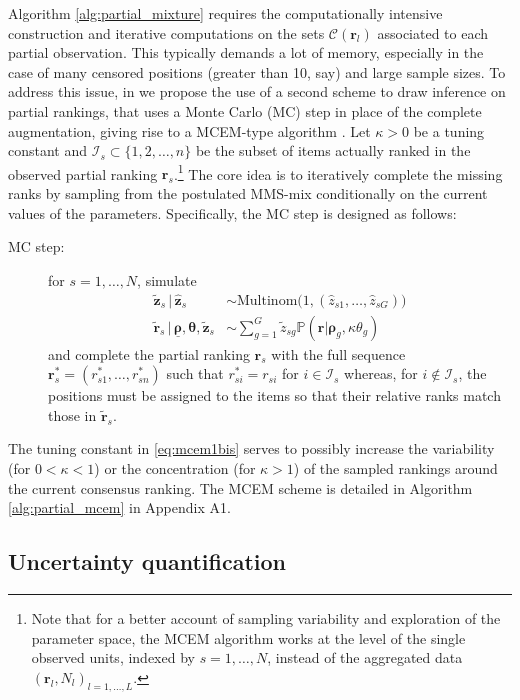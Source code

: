 Algorithm \ref{alg:partial_mixture} requires the computationally intensive construction and iterative computations on the sets $\mathcal{C}(\bm r_l)$ associated to each partial observation. This typically demands a lot of memory, especially in the case of many censored positions (greater than 10, say) and large sample sizes.
To address this issue, in  we propose the use of a second scheme to draw inference on partial rankings, that uses a Monte Carlo (MC) step in place of the complete augmentation, giving rise to a MCEM-type algorithm \citep{wei_tanner}. Let $\kappa > 0$ be a tuning constant and $\mathcal{I}_{s}\subset \{1,2,\dots,n\}$ be the subset of items actually ranked in the observed partial ranking $\bm{r}_s$.\footnote{Note that for a better account of sampling variability and exploration of the parameter space, the MCEM algorithm works at the level of the single observed units, indexed by $s=1,\dots,N$, instead of the aggregated data $(\bm r_l, N_l)_{l=1,\dots,L}$.} The core idea is to iteratively complete the missing ranks by sampling from the postulated MMS-mix conditionally on the current values of the parameters. Specifically, the MC step is designed as follows:
%
\begin{description}
\item[MC step:] for $s=1,\dots,N$, simulate
\begin{align}
\tilde{\bm{z}}_s\,\vert\,\hat{\bm{z}}_s&\sim\text{Multinom}\big(1,(\hat z_{s1},\dots,\hat z_{sG})\big) \label{eq:mcem1}\\
\tilde{\bm{r}}_s\,\vert\,\underline{\bm{\rho}},{\bm{\theta}},\tilde{\bm{z}}_s&\sim\sum_{g=1}^G\tilde{z}_{sg}\mathbb{P}\left(\bm{r}|\bm{\rho}_{g},\kappa\theta_{g}\right)
\label{eq:mcem1bis}\end{align}
and complete the partial ranking $\bm{r}_s$ with the full sequence $\bm{r}^*_s=(r^*_{s1},\dots,r^*_{sn})$ such that $r^*_{si}=r_{si}$ for $i\in\mathcal{I}_s$ whereas,
for $i\notin\mathcal{I}_s$, the positions must be assigned to the items so that their relative ranks match those in $\tilde{\bm{r}}_s$.
\end{description}
The tuning constant in \eqref{eq:mcem1bis} serves to possibly increase the variability (for $0<\kappa<1$) or the concentration (for $\kappa >1$) of the sampled rankings around the current consensus ranking. The MCEM scheme is detailed in Algorithm \ref{alg:partial_mcem} in Appendix A1. 

\subsection{Uncertainty quantification}\label{ssec:uncertainty}

